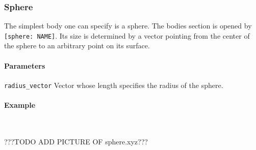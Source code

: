 \subsubsection{Sphere}
The simplest body one can specify is a sphere. The bodies section is opened by \lstinline{[sphere: NAME]}. Its size is determined by a  vector pointing from the center of the sphere to an arbitrary point on its surface.

\paragraph{Parameters}
\begin{description}
 \item{\lstinline{radius_vector}} Vector whose length specifies the radius of the sphere.
\end{description}

\paragraph{Example}\ 

%
???TODO ADD PICTURE OF sphere.xyz???